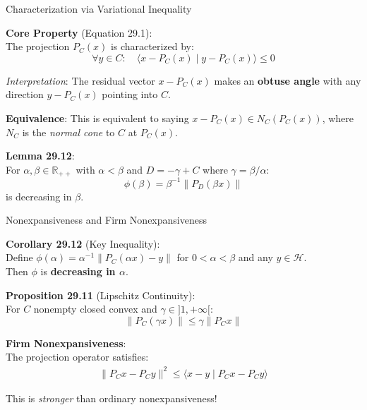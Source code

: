 \documentclass[aspectratio=169,10pt]{beamer}
\begin{document}
\begin{frame}{Characterization via Variational Inequality}

    \textbf{Core Property} (Equation 29.1):\\
    The projection $P_C(x)$ is characterized by:
    $$\forall y \in C: \quad \langle x - P_C(x) \mid y - P_C(x) \rangle \leq 0$$

    \vspace{0.5cm}

    \textit{Interpretation}: The residual vector $x - P_C(x)$ makes an \textbf{obtuse angle} with any direction $y - P_C(x)$ pointing into $C$.

    \vspace{0.5cm}

    \textbf{Equivalence}: This is equivalent to saying $x - P_C(x) \in N_C(P_C(x))$, where $N_C$ is the \textit{normal cone} to $C$ at $P_C(x)$.

    \vspace{0.5cm}

    \textbf{Lemma 29.12}:\\
    For $\alpha, \beta \in \mathbb{R}_{++}$ with $\alpha < \beta$ and $D = -\gamma + C$ where $\gamma = \beta/\alpha$:
    $$\phi(\beta) = \beta^{-1}\|P_D(\beta x)\|$$
    is decreasing in $\beta$.

\end{frame}

\begin{frame}{Nonexpansiveness and Firm Nonexpansiveness}

    \textbf{Corollary 29.12} (Key Inequality):\\
    Define $\phi(\alpha) = \alpha^{-1}\|P_C(\alpha x) - y\|$ for $0 < \alpha < \beta$ and any $y \in \mathcal{H}$.\\
    Then $\phi$ is \textbf{decreasing in $\alpha$}.

    \vspace{0.5cm}

    \textbf{Proposition 29.11} (Lipschitz Continuity):\\
    For $C$ nonempty closed convex and $\gamma \in ]1, +\infty[$:
    $$\|P_C(\gamma x)\| \leq \gamma \|P_C x\|$$

    \vspace{0.5cm}

    \textbf{Firm Nonexpansiveness}:\\
    The projection operator satisfies:
    \begin{align*}
    \|P_C x - P_C y\|^2 \leq \langle x - y \mid P_C x - P_C y \rangle
    \end{align*}

    This is \textit{stronger} than ordinary nonexpansiveness!

\end{frame}
\end{document}
